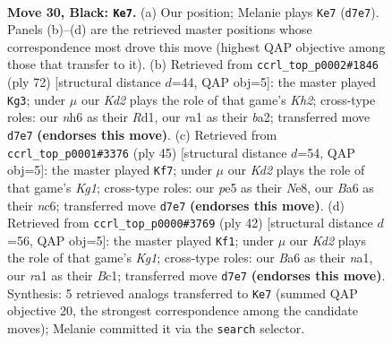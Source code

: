 \documentclass[11pt]{article}
\begin{document}
\clearpage

\begin{figure}[p]\centering
\begin{subfigure}{0.46\textwidth}\centering
\resizebox{\linewidth}{!}{%
\newchessgame
\chessboard[
  setfen={r7/3k4/b1p1p2N/P1b1P2p/3n1P1P/1p6/3B3K/RN6 b - - 6 30},
  showmover=false,
  pgfstyle=straightmove, color=movearrow, markmove={d7-e7}
]}
\caption{}
\end{subfigure}\hfill
\begin{subfigure}{0.46\textwidth}\centering
\resizebox{\linewidth}{!}{%
\newchessgame
\chessboard[
  setfen={6k1/6p1/p3np2/7p/P3PP2/2rpB2P/b2N2PK/3R4 w - - 1 37},
  showmover=false,
  pgfstyle=straightmove, color=movearrow, markmove={h2-g3}
]}
\caption{}
\end{subfigure}
\\[4pt]
\begin{subfigure}{0.46\textwidth}\centering
\resizebox{\linewidth}{!}{%
\newchessgame
\chessboard[
  setfen={r3n1k1/2p3pp/2N1pp2/8/2R2P2/6P1/1P2P2P/6K1 b - - 0 23},
  showmover=false,
  pgfstyle=straightmove, color=movearrow, markmove={g8-f7}
]}
\caption{}
\end{subfigure}\hfill
\begin{subfigure}{0.46\textwidth}\centering
\resizebox{\linewidth}{!}{%
\newchessgame
\chessboard[
  setfen={2k2b1r/5ppp/8/8/1p2P3/4R3/1P3NPP/n1B3K1 w - - 0 22},
  showmover=false,
  pgfstyle=straightmove, color=movearrow, markmove={g1-f1}
]}
\caption{}
\end{subfigure}
\caption{\textbf{Move 30, Black: \texttt{Ke7}.} (a) Our position; Melanie plays \texttt{Ke7} (\texttt{d7e7}). Panels (b)--(d) are the retrieved master positions whose correspondence most drove this move (highest QAP objective among those that transfer to it). (b) Retrieved from \texttt{ccrl\_top\_p0002\#1846} (ply 72) [structural distance $d$=44, QAP obj=5]: the master played \texttt{Kg3}; under $\mu$ our \emph{Kd2} plays the role of that game's \emph{Kh2}; cross-type roles: our \emph{n}h6 as their \emph{R}d1, our \emph{r}a1 as their \emph{b}a2; transferred move \texttt{d7e7} \textbf{(endorses this move)}. (c) Retrieved from \texttt{ccrl\_top\_p0001\#3376} (ply 45) [structural distance $d$=54, QAP obj=5]: the master played \texttt{Kf7}; under $\mu$ our \emph{Kd2} plays the role of that game's \emph{Kg1}; cross-type roles: our \emph{p}e5 as their \emph{N}e8, our \emph{B}a6 as their \emph{n}c6; transferred move \texttt{d7e7} \textbf{(endorses this move)}. (d) Retrieved from \texttt{ccrl\_top\_p0000\#3769} (ply 42) [structural distance $d$=56, QAP obj=5]: the master played \texttt{Kf1}; under $\mu$ our \emph{Kd2} plays the role of that game's \emph{Kg1}; cross-type roles: our \emph{B}a6 as their \emph{n}a1, our \emph{r}a1 as their \emph{B}c1; transferred move \texttt{d7e7} \textbf{(endorses this move)}. Synthesis: 5 retrieved analogs transferred to \texttt{Ke7} (summed QAP objective 20, the strongest correspondence among the candidate moves); Melanie committed it via the \texttt{search} selector.}
\label{fig:thought-m59}
\end{figure}
\end{document}
